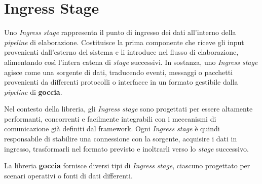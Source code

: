 \section[Ingress Stage]{Ingress Stage}

Uno \textit{Ingress stage} rappresenta il punto di ingresso dei dati all'interno della \textit{pipeline} di elaborazione. Costituisce la prima componente che riceve gli input provenienti dall'esterno del sistema e li introduce nel flusso di elaborazione, alimentando così l'intera catena di \textit{stage} successivi. In sostanza, uno \textit{Ingress stage} agisce come una sorgente di dati, traducendo eventi, messaggi o pacchetti provenienti da differenti protocolli o interfacce in un formato gestibile dalla \textit{pipeline} di \textbf{goccia}.

Nel contesto della libreria, gli \textit{Ingress stage} sono progettati per essere altamente performanti, concorrenti e facilmente integrabili con i meccanismi di comunicazione già definiti dal framework. Ogni \textit{Ingress stage} è quindi responsabile di stabilire una connessione con la sorgente, acquisire i dati in ingresso, trasformarli nel formato previsto e inoltrarli verso lo \textit{stage} successivo.

La libreria \textbf{goccia} fornisce diversi tipi di \textit{Ingress stage}, ciascuno progettato per scenari operativi o fonti di dati differenti.







